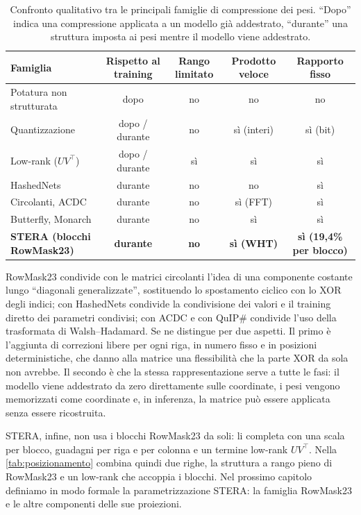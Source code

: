 \begin{table}[ht]
\centering
\small
\begin{tabularx}{\linewidth}{Xcccc}
\toprule
Famiglia & Rispetto al training & Rango limitato & Prodotto veloce & Rapporto fisso \\
\midrule
Potatura non strutturata & dopo & no & no & no \\
Quantizzazione & dopo / durante & no & sì (interi) & sì (bit) \\
Low-rank ($UV^\top$) & dopo / durante & sì & sì & sì \\
HashedNets & durante & no & no & sì \\
Circolanti, ACDC & durante & no & sì (FFT) & sì \\
Butterfly, Monarch & durante & no & sì & sì \\
\textbf{STERA (blocchi RowMask23)} & \textbf{durante} & \textbf{no} & \textbf{sì (WHT)} & \textbf{sì (19,4\% per blocco)} \\
\bottomrule
\end{tabularx}
\caption{Confronto qualitativo tra le principali famiglie di compressione dei pesi. ``Dopo'' indica una compressione applicata a un modello già addestrato, ``durante'' una struttura imposta ai pesi mentre il modello viene addestrato.}
\label{tab:posizionamento}
\end{table}

RowMask23 condivide con le matrici circolanti l'idea di una componente costante lungo ``diagonali generalizzate'', sostituendo lo spostamento ciclico con lo XOR degli indici; con HashedNets condivide la condivisione dei valori e il training diretto dei parametri condivisi; con ACDC e con QuIP\# condivide l'uso della trasformata di Walsh--Hadamard. Se ne distingue per due aspetti. Il primo è l'aggiunta di correzioni libere per ogni riga, in numero fisso e in posizioni deterministiche, che danno alla matrice una flessibilità che la parte XOR da sola non avrebbe. Il secondo è che la stessa rappresentazione serve a tutte le fasi: il modello viene addestrato da zero direttamente sulle coordinate, i pesi vengono memorizzati come coordinate e, in inferenza, la matrice può essere applicata senza essere ricostruita.

STERA, infine, non usa i blocchi RowMask23 da soli: li completa con una scala per blocco, guadagni per riga e per colonna e un termine low-rank $UV^\top$. Nella \autoref{tab:posizionamento} combina quindi due righe, la struttura a rango pieno di RowMask23 e un low-rank che accoppia i blocchi. Nel prossimo capitolo definiamo in modo formale la parametrizzazione STERA: la famiglia RowMask23 e le altre componenti delle sue proiezioni.
